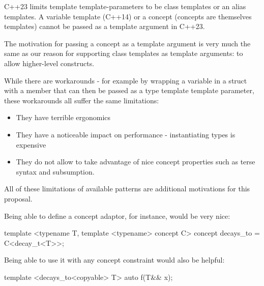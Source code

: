 \documentclass{wg21}
\begin{document}
C++23 limits template template-parameters to be class templates or an alias templates.
A variable template (C++14) or a concept (concepts are themselves templates) cannot be passed as a template argument in C++23.

The motivation for passing a concept as a template argument is very much the same as our reason for supporting class templates as template arguments: to allow higher-level constructs.

While there are workarounds - for example by wrapping a variable in a struct with a  member that can then be passed as a type template template parameter, these workarounds
all suffer the same limitations:

\begin{itemize}
    \item They have terrible ergonomics
    \item They have a noticeable impact on performance - instantiating types is expensive
    \item They do not allow to take advantage of nice concept properties such as terse syntax and subsumption.
\end{itemize}

All of these limitations of available patterns are additional motivations for this proposal.


Being able to define a concept adaptor, for instance, would be very nice:

\begin{colorblock}
template <typename T, template <typename> concept C>
concept decays_to = C<decay_t<T>>;
\end{colorblock}

Being able to use it with any concept constraint would also be helpful:

\begin{colorblock}
template <decays_to<copyable> T>
auto f(T&& x);
\end{colorblock}
\end{document}
